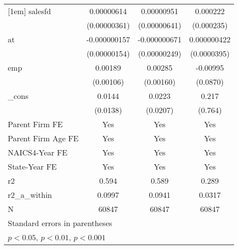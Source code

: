 {\begin{tabular}{l*{3}{c}}
[1em]
salesfd     &  0.00000614         &  0.00000951         &    0.000222         \\
            &(0.00000361)         &(0.00000641)         &  (0.000235)         \\
[1em]
at          &-0.000000157         &-0.000000671         & 0.000000422         \\
            &(0.00000154)         &(0.00000249)         & (0.0000395)         \\
[1em]
emp         &     0.00189         &     0.00285         &    -0.00995         \\
            &   (0.00106)         &   (0.00160)         &    (0.0870)         \\
[1em]
\_cons      &      0.0144         &      0.0223         &       0.217         \\
            &    (0.0138)         &    (0.0207)         &     (0.764)         \\
[1em]
Parent Firm FE&         Yes         &         Yes         &         Yes         \\
[1em]
Parent Firm Age FE&         Yes         &         Yes         &         Yes         \\
[1em]
NAICS4-Year FE&         Yes         &         Yes         &         Yes         \\
[1em]
State-Year FE&         Yes         &         Yes         &         Yes         \\
\hline
r2          &       0.594         &       0.589         &       0.289         \\
r2\_a\_within &      0.0997         &      0.0941         &      0.0317         \\
N           &       60847         &       60847         &       60847         \\
\hline\hline
\multicolumn{4}{l}{\footnotesize Standard errors in parentheses}\\
\multicolumn{4}{l}{\footnotesize \sym{*} \(p<0.05\), \sym{**} \(p<0.01\), \sym{***} \(p<0.001\)}\\
\end{tabular}
}
